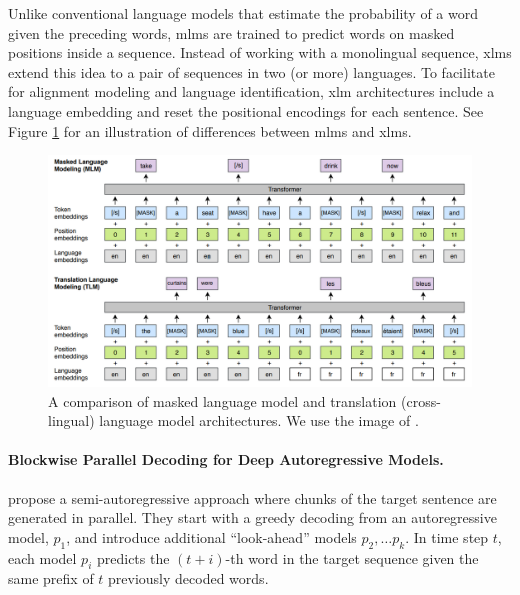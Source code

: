 Unlike conventional language models that estimate the probability of a word
given the preceding words, \acp{mlm} are trained to predict words on masked
positions inside a sequence. Instead of working with a monolingual sequence,
\acp{xlm} extend this idea to a pair of sequences in two (or more) languages.
To facilitate for alignment modeling and language identification, \ac{xlm}
architectures include a language embedding and reset the positional encodings
for each sentence. See Figure \ref{fig:mlm-xlm-example} for an illustration of
differences between \acp{mlm} and \acp{xlm}.

\begin{figure}
  \centering

  \includegraphics[width=\textwidth]{img/mlm-xlm.png}

  \caption{A comparison of masked language model and translation
    (cross-lingual) language model architectures. We use the image of
    \citet{conneau-lample-2019-cross}.}%
  \label{fig:mlm-xlm-example}
\end{figure}






\paragraph{Blockwise Parallel Decoding for Deep Autoregressive Models.}
\citet{stern2018blockwise} propose a semi-autoregressive approach where chunks
of the target sentence are generated in parallel.
%
They start with a greedy decoding from an autoregressive model, $p_1$, and
introduce additional ``look-ahead'' models $p_2, \ldots p_k$. In time step $t$,
each model $p_i$ predicts the $(t + i)$-th word in the target sequence given the
same prefix of $t$ previously decoded words.


